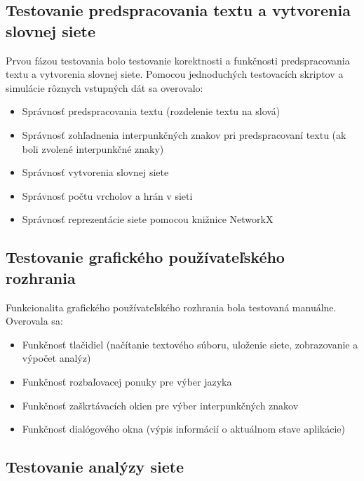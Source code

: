 \subsection{Testovanie predspracovania textu a vytvorenia slovnej siete}\label{sec:testingPreprocessing}

Prvou fázou testovania bolo testovanie korektnosti a funkčnosti predspracovania textu a vytvorenia slovnej siete. Pomocou jednoduchých
testovacích skriptov a simulácie rôznych vstupných dát sa overovalo:
\begin{itemize}
    \item Správnosť predspracovania textu (rozdelenie textu na slová)
    \item Správnosť zohľadnenia interpunkčných znakov pri predspracovaní textu (ak boli zvolené interpunkčné znaky)
    \item Správnosť vytvorenia slovnej siete
    \item Správnosť počtu vrcholov a hrán v sieti
    \item Správnosť reprezentácie siete pomocou knižnice NetworkX
\end{itemize}

\subsection{Testovanie grafického používateľského rozhrania}\label{sec:testingGUI}

Funkcionalita grafického používateľského rozhrania bola testovaná manuálne. Overovala sa:
\begin{itemize}
    \item Funkčnosť tlačidiel (načítanie textového súboru, uloženie siete, zobrazovanie a výpočet analýz)
    \item Funkčnosť rozbaľovacej ponuky pre výber jazyka
    \item Funkčnosť zaškrtávacích okien pre výber interpunkčných znakov
    \item Funkčnosť dialógového okna (výpis informácií o aktuálnom stave aplikácie)
\end{itemize}

\subsection{Testovanie analýzy siete}\label{sec:testingNetworkAnalysis}

